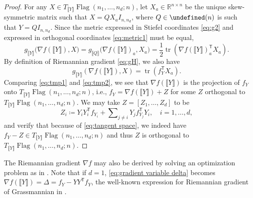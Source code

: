\documentclass[11pt,reqno]{amsart}%
\theoremstyle{definition}
\theoremstyle{remark}
\newcommand{\tp}{{\scriptscriptstyle\mathsf{T}}}
\newcommand{\lb}{\llbracket}
\newcommand{\rb}{\rrbracket}
\let\O\undefined
\DeclareMathOperator{\Flag}{Flag}
\DeclareMathOperator{\O}{O}
\DeclareMathOperator{\tr}{tr}
\begin{document}
\begin{proof}
For any $X\in T_{\lb Y \rb} \Flag(n_1,\dots,n_d;n)$, let $X_a\in \mathbb{R}^{n\times n}$ be the unique skew-symmetric matrix such that $X = Q X_a I_{n,n_d}$, where $Q\in \O(n)$ is such that $Y = QI_{n,n_d}$. Since the metric expressed in Stiefel coordinates \eqref{eq:g2} and expressed in orthogonal coordinates \eqref{eq:metric1} must be equal,
\begin{equation}\label{eq:tmp1}
g_{\lb Y \rb} \bigl( \nabla f (\lb Y \rb),X \bigr)  = g_{\lb Q \rb} \bigl(\nabla f  (\lb Y \rb)_a, X_a\bigr) = \frac{1}{2} \tr ( \nabla f  (\lb Y \rb)_a^\tp X_a).
\end{equation}
By definition of Riemannian gradient \eqref{eq:gH}, we also have
\begin{equation}\label{eq:tmp2}
g_{\lb Y \rb}(\nabla f(\lb Y\rb), X) =  \tr (f_Y^\tp  X_a).
\end{equation}
Comparing \eqref{eq:tmp1} and \eqref{eq:tmp2}, we see that $\nabla f(\lb Y\rb) $ is the projection of $f_Y$ onto $T_{\lb Y \rb} \Flag(n_1,\dots,n_d;n)$, i.e., $f_Y = \nabla f(\lb Y\rb)  + Z$ for some $Z$ orthogonal to $T_{\lb Y \rb} \Flag(n_1,\dots,n_d;n)$. We may take $Z = [Z_1,\dots, Z_d]$ to be
\[
Z_i \coloneqq Y_i Y_i^\tp  f_{Y_i} + \sum\nolimits_{j\ne i } Y_j f_{Y_j}^\tp  Y_i,\quad i=1,\dots,d,
\]
and verify that because of \eqref{eq:tangent space}, we indeed have $f_Y - Z\in T_{\lb Y \rb} \Flag(n_1,\dots,n_d;n)$ and thus $Z$ is orthogonal to $T_{\lb Y \rb} \Flag(n_1,\dots,n_d;n)$.
\end{proof}
The Riemannian gradient $\nabla f$ may also be derived by solving an optimization problem as in \cite{NSP2006}. Note that if $d = 1$, \eqref{eq:gradient variable delta} becomes $\nabla f (\lb Y \rb) = \Delta = f_Y -  Y Y^\tp  f_Y$, the well-known expression for Riemannian gradient of Grassmannian in \cite{EAS}.
\end{document}
